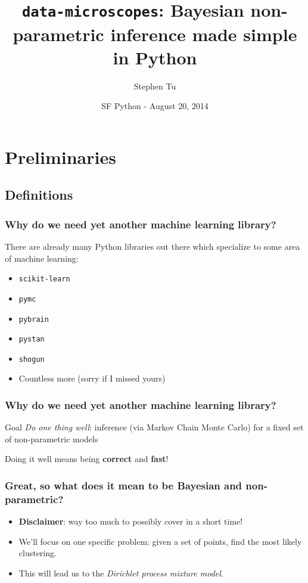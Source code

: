 \documentclass{beamer}
\title[data-microscopes]{
  \texttt{data-microscopes}: Bayesian non-parametric inference made simple in Python
}
\author{Stephen Tu}
\date[SFPython]{SF Python - August 20, 2014}
\begin{document}
\begin{frame}
\titlepage
\end{frame}

\section{Preliminaries}
\subsection{Definitions}

\begin{frame}
\frametitle{Why do we need yet another machine learning library?}
There are already many Python libraries out there which specialize to 
some area of machine learning:
\begin{itemize}[<+->]
  \item \texttt{scikit-learn}
  \item \texttt{pymc}
  \item \texttt{pybrain}
  \item \texttt{pystan}
  \item \texttt{shogun}
  \item Countless more (sorry if I missed yours)
\end{itemize}
\end{frame}


\begin{frame}
\frametitle{Why do we need yet another machine learning library?}
\begin{block}{Goal}
\emph{Do one thing well}: inference (via Markov Chain Monte Carlo)
for a fixed set of non-parametric models 
\end{block}

Doing it well means being \textbf{correct} and \textbf{fast}!
\end{frame}


\begin{frame}
\frametitle{Great, so what does it mean to be Bayesian and non-parametric?}
\begin{itemize}[<+->]
  \item \textbf{Disclaimer}: way too much to possibly cover in a short time!
  \item We'll focus on one specific problem: 
    given a set of points, find the most likely clustering.
  \item This will lead us to the \emph{Dirichlet process mixture model}.
\end{itemize}
\end{frame}
\end{document}
